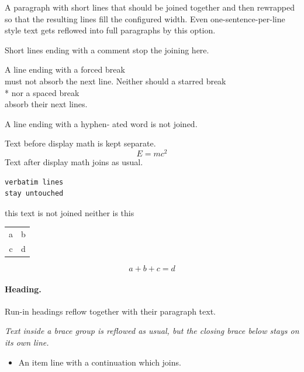 \documentclass[
  a4paper,
  11pt,
  twoside,
  onecolumn
]{article}
\begin{document}
A paragraph with short lines that should be joined together and then
rewrapped so that the resulting lines fill the configured width. Even
one-sentence-per-line style text gets reflowed into full paragraphs
by this option.

Short lines ending with a comment %
stop the joining here.

A line ending with a forced break \\
must not absorb the next line.
Neither should a starred break \\*
nor a spaced break \\[2pt]
absorb their next lines.

A line ending with a hyphen-
ated word is not joined.


Text before display math is kept separate.
\[
  E = m c^2
\]
Text after display math joins as usual.

\begin{verbatim}
verbatim lines
stay untouched
\end{verbatim}

this text
is not joined %
neither
is this

\begin{tabular}{cc}
  a & b \\
  c & d \\
\end{tabular}


\begin{equation}
  a + b
  + c = d
\end{equation}

\paragraph{Heading.} Run-in headings reflow together with their paragraph text.

\emph{
  Text inside a brace group is reflowed as usual, but the closing
  brace below stays on its own line.
}

\begin{itemize}
  \item An item line
    with a continuation which joins.
\end{itemize}
\end{document}
